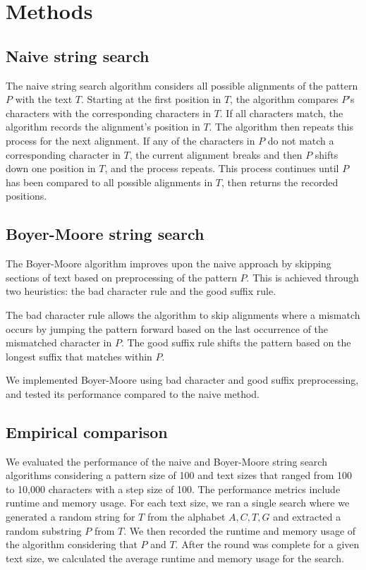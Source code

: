 \documentclass[11pt, letterpaper]{article}
\begin{document}

\section{Methods}

\subsection{Naive string search}
The naive string search algorithm considers all possible alignments of the
pattern $P$ with the text $T$. Starting at the first position in $T$, the
algorithm compares $P$'s characters with the corresponding characters in $T$.
If all characters match, the algorithm records the alignment's position in $T$.
The algorithm then repeats this process for the next alignment. If any of the 
characters in $P$ do not match a corresponding character in $T$, the current
alignment breaks and then $P$ shifts down one position in $T$, and the process
repeats. This process continues until $P$ has been compared to all possible
alignments in $T$, then returns the recorded positions.

\subsection{Boyer-Moore string search}
The Boyer-Moore algorithm improves upon the naive approach by skipping sections
of text based on preprocessing of the pattern $P$. This is achieved through two
heuristics: the bad character rule and the good suffix rule.

The bad character rule allows the algorithm to skip alignments where a mismatch
occurs by jumping the pattern forward based on the last occurrence of the
mismatched character in $P$. The good suffix rule shifts the pattern based on
the longest suffix that matches within $P$.

We implemented Boyer-Moore using bad character and good suffix preprocessing,
and tested its performance compared to the naive method.

\subsection{Empirical comparison}

We evaluated the performance of the naive and Boyer-Moore string search
algorithms considering a pattern size of 100 and text sizes that ranged from
100 to 10,000 characters with a step size of 100. The performance metrics
include runtime and memory usage. For each text size, we ran a single search
where we generated a random string for $T$ from the alphabet ${A, C, T, G}$ and
extracted a random substring $P$ from $T$. We then recorded the runtime and
memory usage of the algorithm considering that $P$ and $T$. After the round was
complete for a given text size, we calculated the average runtime and memory
usage for the search.
\end{document}
